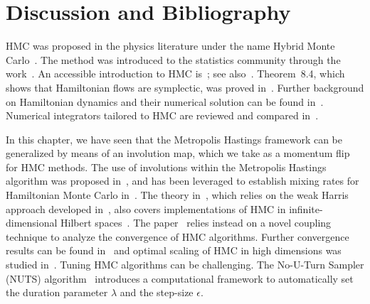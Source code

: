 
\section{Discussion and Bibliography}
\label{sec:8.3}

HMC was proposed in the physics literature under the name Hybrid Monte Carlo~\cite{60}. The
method was introduced to the statistics community through the work~\cite{171}. An accessible
introduction to HMC is~\cite{170}; see also~\cite{23}. Theorem~8.4, which shows that
Hamiltonian flows are symplectic, was proved in~\cite{187}. Further background on Hamiltonian
dynamics and their numerical solution can be found in~\cite{210,101}. Numerical integrators
tailored to HMC are reviewed and compared in~\cite{31,42}.

In this chapter, we have seen that the Metropolis Hastings framework can be generalized by
means of an involution map, which we take as a momentum flip for HMC methods. The use of
involutions within the Metropolis Hastings algorithm was proposed in~\cite{11,92}, and has been
leveraged to establish mixing rates for Hamiltonian Monte Carlo in~\cite{92}. The theory
in~\cite{92}, which relies on the weak Harris approach developed in~\cite{102}, also covers
implementations of HMC in infinite-dimensional Hilbert spaces~\cite{22}. The paper~\cite{30}
relies instead on a novel coupling technique to analyze the convergence of HMC algorithms.
Further convergence results can be found in~\cite{148,65} and optimal scaling of HMC in high
dimensions was studied in~\cite{21}. Tuning HMC algorithms can be challenging. The No-U-Turn
Sampler (NUTS) algorithm~\cite{113} introduces a computational framework to automatically set
the duration parameter $\lambda$ and the step-size $\epsilon$.
